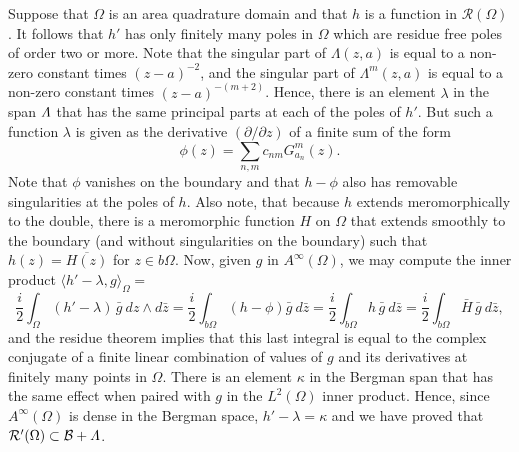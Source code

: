 \documentclass[12pt]{amsart}
\newcommand\dee{\partial}
\newcommand\Om{\Omega}
\numberwithin{equation}{section}
\begin{document}
Suppose that $\Om$ is an area quadrature
domain and that $h$ is a function in ${\mathcal R}(\Om)$.
It follows that $h'$ has only finitely many poles in $\Om$
which are residue free poles of order two or more.
Note that the singular part of $\Lambda(z,a)$ is equal to
a non-zero constant times $(z-a)^{-2}$, and the singular
part of $\Lambda^m(z,a)$ is equal to a non-zero constant
times $(z-a)^{-(m+2)}$. Hence, there is an element
$\lambda$ in the span $\mathnormal{\Lambda}$ that has the
same principal parts at each of the poles of $h'$. But
such a function $\lambda$ is given as the derivative
$(\dee/\dee z)$ of a finite sum of the form
$$\phi(z)=\sum_{n,m}c_{nm}G_{a_n}^m(z).$$
Note that $\phi$ vanishes on the boundary and that $h-\phi$
also has removable singularities at the poles of $h$.
Also note, that because $h$ extends meromorphically to
the double, there is a meromorphic function $H$ on $\Om$ that
extends smoothly to the boundary (and without singularities
on the boundary) such that $h(z)=\overline{H(z)}$ for
$z\in b\Om$.
Now, given $g$ in $A^\infty(\Om)$, we may compute the
inner product $\langle h'-\lambda, g\rangle_{\Om} =$
$$\frac{i}{2}\int_{\Om} (h'-\lambda)\, \bar g\  dz\wedge d\bar z
=\frac{i}{2}\int_{b\Om} (h-\phi) \bar g\ d\bar z 
=\frac{i}{2}\int_{b\Om} h\, \bar g\ d\bar z
=\frac{i}{2}\int_{b\Om} \bar H \, \bar g\ d\bar z,
$$
and the residue theorem implies that this last integral
is equal to the complex conjugate of a finite linear
combination of values of $g$ and its derivatives at
finitely many points in $\Om$. There is an element
$\kappa$ in the Bergman span that has the same effect when
paired with $g$ in the $L^2(\Om)$ inner product. Hence,
since $A^\infty(\Om)$ is dense in the Bergman space,
$h'-\lambda=\kappa$ and we have proved that
$\mathcal{R}'(\Om)\subset \mathcal{B}+\mathnormal{\Lambda}$.
\end{document}
